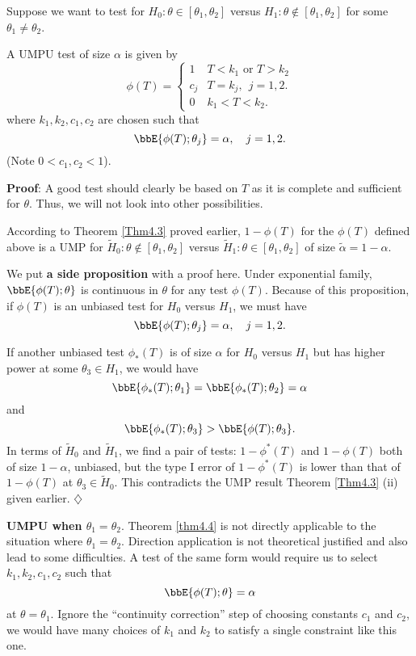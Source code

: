 \begin{theorem}
\label{thm4.4}
Suppose we want to test for $H_0: \theta \in [\theta_1, \theta_2]$
versus $H_1: \theta \not \in [\theta_1, \theta_2]$ for
some $\theta_1 \neq \theta_2$.

A UMPU test of size $\alpha$ is given by
\[
\phi(T)
=
\left \{
\begin{array}{ll}
1  & T  < k_1 \mbox{  or  } T > k_2\\
c_j &   T= k_j,~~ j=1, 2.\\
0  & k_1 < T < k_2.
\end{array}
\right .
\]
where $k_1, k_2, c_1, c_2$ are chosen such that
\[
\bbE\{ \phi(T); \theta_j \} = \alpha, ~~~j=1, 2.
\]
(Note $ 0 < c_1, c_2 < 1 $).
\end{theorem}

\vs \no
{\bf Proof}:
A good test should clearly be based on $T$ as it is complete and sufficient
for $\theta$. Thus, we will not look into other possibilities.

According to Theorem \ref{Thm4.3} proved earlier, $1-\phi(T)$ for the $\phi(T)$ defined
above is a UMP for $\tilde H_0: \theta \not \in [\theta_1, \theta_2]$ versus
$\tilde H_1: \theta  \in [\theta_1, \theta_2]$ of size $\tilde \alpha = 1 - \alpha$.

We put {\bf a side proposition} with a proof here. Under exponential family, 
$\bbE\{ \phi(T); \theta\}$ is continuous in $\theta$ for any test $\phi(T)$.
Because of this proposition, if $\phi(T)$ is an unbiased
test for $H_0$ versus $H_1$, we must have
\[
\bbE\{ \phi(T); \theta_j \} = \alpha, ~~~j=1, 2.
\]

If another unbiased test $\phi_*(T)$ is of size 
$\alpha$ for $H_0$ versus $H_1$ but
has higher power at some $\theta_3 \in H_1$, we would have
\[
\bbE\{ \phi_*(T) ; \theta_1 \} = \bbE\{ \phi_*(T) ; \theta_2 \} = \alpha
\]
and
\[
\bbE\{ \phi_*(T) ; \theta_3 \} > \bbE\{ \phi(T) ; \theta_3 \}.
\]
In terms of $\tilde H_0$ and $\tilde H_1$, we find a pair of
tests: $1 - \phi^*(T)$ and $1 - \phi(T)$ both of size $1-\alpha$,
unbiased, but
the type I error  of $1 - \phi^*(T)$ is lower than that
of $1 - \phi(T)$ at $\theta_3 \in \tilde H_0$.
This contradicts the UMP result Theorem \ref{Thm4.3}  (ii) 
given earlier. 
\hfill{$\diamondsuit$}

\vs
{\bf UMPU when $\theta_1 = \theta_2$}.
Theorem \ref{thm4.4} is not directly applicable to the situation where
$\theta_1 = \theta_2$. Direction application is not theoretical justified
and also lead to some difficulties.
A test of the same form would require us to
select $k_1, k_2, c_1, c_2$ such that
\[
\bbE\{ \phi(T); \theta \} = \alpha
\]
at $\theta = \theta_1$.
Ignore the ``continuity correction'' step of choosing constants $c_1$
and $c_2$,
we would have many choices of $k_1$ and $k_2$ to satisfy a
single constraint like this one. 

